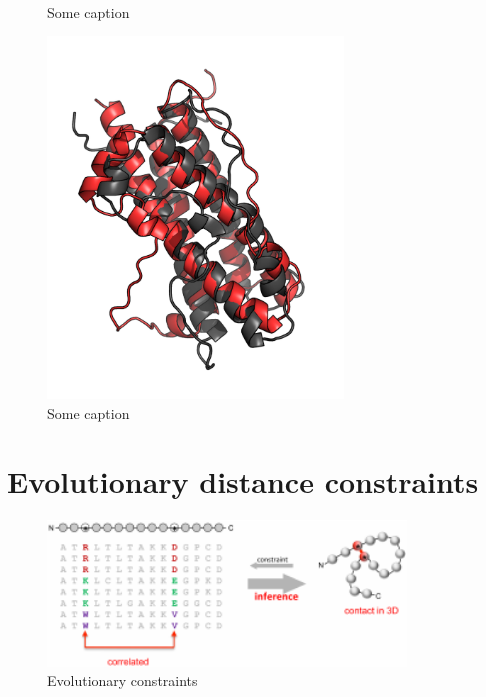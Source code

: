 \begin{figure}
{    }\\
    \caption{Some caption}
    \label{fig:rhodopsin}%
\end{figure}


\begin{figure}%
    \centering
    \includegraphics[width=0.7\textwidth]{figures/prolactin_lowest_e.pdf}
    \caption{Some caption}
    \label{fig:prolactin}%
\end{figure}




\clearpage


\section{Evolutionary distance constraints}

\begin{figure}
    \includegraphics[width=0.85\textwidth]{figures/evo_constraint.pdf}
    \caption{Evolutionary constraints}
    \label{fig:evo_constraint}
\end{figure}

